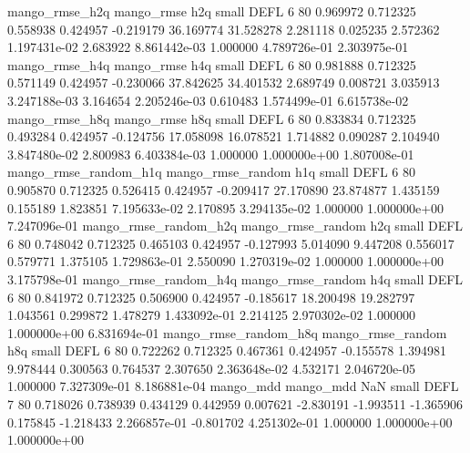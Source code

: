        mango_rmse_h2q        mango_rmse                  h2q      small     DEFL                 6 80 0.969972       0.712325 0.558938       0.424957   -0.219179     36.169774     31.528278     2.281118       0.025235  2.572362 1.197431e-02     2.683922   8.861442e-03            1.000000    4.789726e-01        2.303975e-01
       mango_rmse_h4q        mango_rmse                  h4q      small     DEFL                 6 80 0.981888       0.712325 0.571149       0.424957   -0.230066     37.842625     34.401532     2.689749       0.008721  3.035913 3.247188e-03     3.164654   2.205246e-03            0.610483    1.574499e-01        6.615738e-02
       mango_rmse_h8q        mango_rmse                  h8q      small     DEFL                 6 80 0.833834       0.712325 0.493284       0.424957   -0.124756     17.058098     16.078521     1.714882       0.090287  2.104940 3.847480e-02     2.800983   6.403384e-03            1.000000    1.000000e+00        1.807008e-01
mango_rmse_random_h1q mango_rmse_random                  h1q      small     DEFL                 6 80 0.905870       0.712325 0.526415       0.424957   -0.209417     27.170890     23.874877     1.435159       0.155189  1.823851 7.195633e-02     2.170895   3.294135e-02            1.000000    1.000000e+00        7.247096e-01
mango_rmse_random_h2q mango_rmse_random                  h2q      small     DEFL                 6 80 0.748042       0.712325 0.465103       0.424957   -0.127993      5.014090      9.447208     0.556017       0.579771  1.375105 1.729863e-01     2.550090   1.270319e-02            1.000000    1.000000e+00        3.175798e-01
mango_rmse_random_h4q mango_rmse_random                  h4q      small     DEFL                 6 80 0.841972       0.712325 0.506900       0.424957   -0.185617     18.200498     19.282797     1.043561       0.299872  1.478279 1.433092e-01     2.214125   2.970302e-02            1.000000    1.000000e+00        6.831694e-01
mango_rmse_random_h8q mango_rmse_random                  h8q      small     DEFL                 6 80 0.722262       0.712325 0.467361       0.424957   -0.155578      1.394981      9.978444     0.300563       0.764537  2.307650 2.363648e-02     4.532171   2.046720e-05            1.000000    7.327309e-01        8.186881e-04
            mango_mdd         mango_mdd                  NaN      small     DEFL                 7 80 0.718026       0.738939 0.434129       0.442959    0.007621     -2.830191     -1.993511    -1.365906       0.175845 -1.218433 2.266857e-01    -0.801702   4.251302e-01            1.000000    1.000000e+00        1.000000e+00
